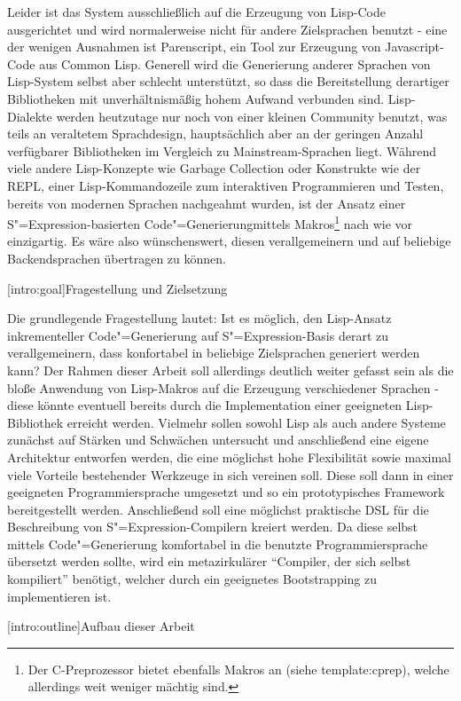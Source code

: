 \documentclass[11pt, a4paper, bibgerm]{book}
\newcommand\lsection{}
\newcommand\sref{}
\newcommand{\sees}[1]{(siehe \sref{#1})}
\newcommand{\sexp}{S"=Expression}
\newcommand{\cgen}{Code"=Generierung}
\begin{document}
Leider ist das System ausschließlich auf die Erzeugung von Lisp-Code
ausgerichtet und wird normalerweise nicht für andere Zielsprachen
benutzt - eine der wenigen Ausnahmen ist Parenscript\cite{parenscript},
ein Tool zur Erzeugung von Javascript-Code aus Common Lisp. Generell
wird die Generierung anderer Sprachen von Lisp-System selbst aber
schlecht unterstützt, so dass die Bereitstellung derartiger Bibliotheken
mit unverhältnismäßig hohem Aufwand verbunden sind. Lisp-Dialekte werden
heutzutage nur noch von einer kleinen Community benutzt, was teils an
veraltetem Sprachdesign, hauptsächlich aber an der geringen Anzahl
verfügbarer Bibliotheken im Vergleich zu Mainstream-Sprachen
liegt. Während viele andere Lisp-Konzepte wie Garbage Collection oder
Konstrukte wie der REPL, einer Lisp-Kommandozeile zum interaktiven
Programmieren und Testen, bereits von modernen Sprachen nachgeahmt
wurden, ist der Ansatz einer \sexp-basierten \cgen mittels
Makros\footnote{Der C-Preprozessor bietet ebenfalls Makros an
  \sees{template:cprep}, welche allerdings weit weniger mächtig sind.}
nach wie vor einzigartig. Es wäre also wünschenswert, diesen
verallgemeinern und auf beliebige Backendsprachen übertragen zu können.

\lsection[intro:goal]{Fragestellung und Zielsetzung}

Die grundlegende Fragestellung lautet: Ist es möglich, den Lisp-Ansatz
inkrementeller \cgen{} auf \sexp{}-Basis derart zu verallgemeinern, dass
konfortabel in beliebige Zielsprachen generiert werden kann? Der Rahmen
dieser Arbeit soll allerdings deutlich weiter gefasst sein als die bloße
Anwendung von Lisp-Makros auf die Erzeugung verschiedener Sprachen -
diese könnte eventuell bereits durch die Implementation einer geeigneten
Lisp-Bibliothek erreicht werden. Vielmehr sollen sowohl Lisp als auch
andere Systeme zunächst auf Stärken und Schwächen untersucht und
anschließend eine eigene Architektur entworfen werden, die eine
möglichst hohe Flexibilität sowie maximal viele Vorteile bestehender
Werkzeuge in sich vereinen soll. Diese soll dann in einer geeigneten
Programmiersprache umgesetzt und so ein prototypisches Framework
bereitgestellt werden. Anschließend soll eine möglichst praktische DSL
für die Beschreibung von \sexp{}-Compilern kreiert werden. Da diese
selbst mittels \cgen{} komfortabel in die benutzte Programmiersprache
übersetzt werden sollte, wird ein metazirkulärer "`Compiler, der sich
selbst kompiliert"' benötigt, welcher durch ein geeignetes Bootstrapping
zu implementieren ist.

\lsection[intro:outline]{Aufbau dieser Arbeit}
\end{document}
